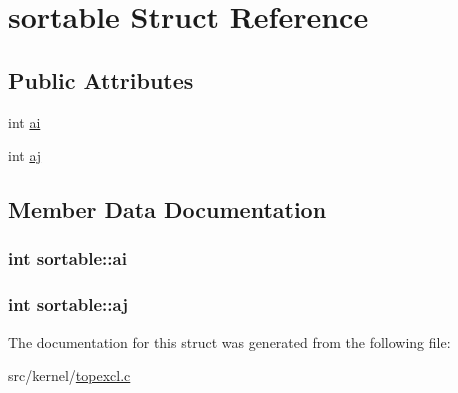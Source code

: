 \hypertarget{structsortable}{\section{sortable \-Struct \-Reference}
\label{structsortable}
}
\subsection*{\-Public \-Attributes}
\begin{DoxyCompactItemize}
\item 
int \hyperlink{structsortable_a72eba453e02cbd2f1e8da7f91e3f6468}{ai}
\item 
int \hyperlink{structsortable_ad8fd23f145b00a9f86063484334bc777}{aj}
\end{DoxyCompactItemize}


\subsection{\-Member \-Data \-Documentation}
\hypertarget{structsortable_a72eba453e02cbd2f1e8da7f91e3f6468}{
\subsubsection[{ai}]{\setlength{\rightskip}{0pt plus 5cm}int {\bf sortable\-::ai}}}\label{structsortable_a72eba453e02cbd2f1e8da7f91e3f6468}
\hypertarget{structsortable_ad8fd23f145b00a9f86063484334bc777}{
\subsubsection[{aj}]{\setlength{\rightskip}{0pt plus 5cm}int {\bf sortable\-::aj}}}\label{structsortable_ad8fd23f145b00a9f86063484334bc777}


\-The documentation for this struct was generated from the following file\-:\begin{DoxyCompactItemize}
\item 
src/kernel/\hyperlink{topexcl_8c}{topexcl.\-c}\end{DoxyCompactItemize}
